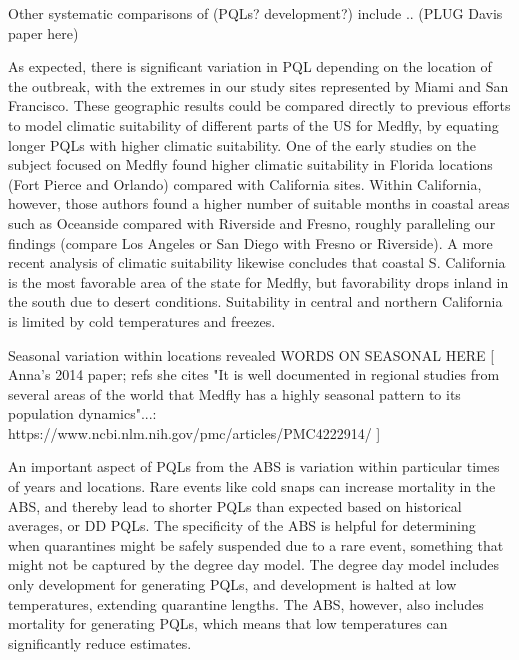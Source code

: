\documentclass[10pt,a4paper,twocolumn]{article}
\begin{document}
Other systematic comparisons of (PQLs? development?) include .. (PLUG Davis paper here) 


As expected, there is significant variation in PQL depending on the location of the outbreak, 
with the extremes in our study sites represented by Miami and San Francisco.
These geographic results could be
compared directly to previous efforts to model climatic suitability of different parts of the US 
for Medfly, by equating longer PQLs with higher climatic suitability.
One of the early studies on the subject focused on Medfly found higher climatic suitability in 
Florida locations (Fort Pierce and Orlando) compared with California 
sites\cite{messenger_bioclimatic_1954}. 
Within California, however, those authors found a higher number of suitable months in coastal 
areas such as Oceanside compared with Riverside and Fresno, roughly paralleling our 
findings (compare Los Angeles or San Diego with Fresno or Riverside).
A more recent analysis of climatic suitability likewise concludes that coastal 
S. California is the most favorable area of the state for Medfly, but 
favorability drops inland in the south due to desert conditions.
Suitability in central and northern California is limited by cold temperatures and 
freezes\cite{gutierrez_assessing_2011}. 


Seasonal variation within locations revealed WORDS ON SEASONAL HERE
[
Anna's 2014 paper; refs she cites "It is well documented in regional studies from several areas of the world that Medfly has a highly seasonal pattern to its population dynamics"...:
https://www.ncbi.nlm.nih.gov/pmc/articles/PMC4222914/
]


An important aspect of PQLs from the ABS is variation within particular times of years and locations. 
Rare events like cold snaps can increase mortality in the ABS,
and thereby lead to shorter PQLs than expected based on historical averages, or DD PQLs.
The specificity of the ABS is helpful for determining 
when quarantines might be safely suspended due to a rare event,
something that might not be captured by the degree day model.
The degree day model includes only development for generating PQLs,
and development is halted at low temperatures, extending quarantine lengths.
The ABS, however, also includes mortality for generating PQLs,
which means that low temperatures can significantly reduce estimates.
\end{document}
